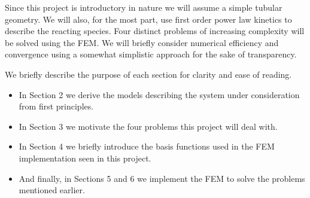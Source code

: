 \documentclass[11pt,fleqn]{article}
\theoremstyle{defstyle}
\begin{document}
Since this project is introductory in nature we will assume a simple tubular geometry. We will also, for the most part, use first order power law kinetics to describe the reacting species. Four distinct problems of increasing complexity will be solved using the FEM. We will briefly consider numerical efficiency and convergence using a somewhat simplistic approach for the sake of transparency.  

We briefly describe the purpose of each section for clarity and ease of reading.
\begin{itemize}
\item 
In Section 2 we derive the models describing the system under consideration from first principles.
\item
In Section 3 we motivate the four problems this project will deal with.
\item
In Section 4 we briefly introduce the basis functions used in the FEM implementation seen in this project.
\item
And finally, in Sections 5 and 6 we implement the FEM to solve the problems mentioned earlier.
\end{itemize}
\end{document}
